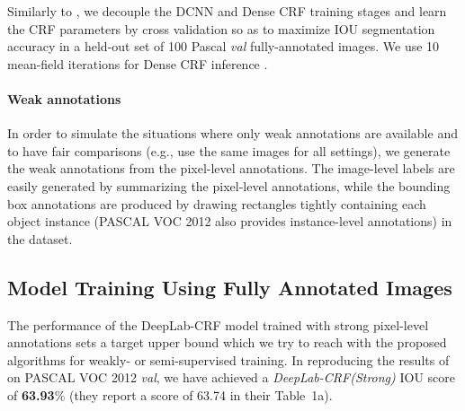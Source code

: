 Similarly to \citet{chen2014semantic}, we decouple the DCNN and Dense
CRF training stages and learn the CRF parameters by cross validation
so as to maximize IOU segmentation accuracy in a held-out set of 100
Pascal \textsl{val} fully-annotated images. We use 10 mean-field
iterations for Dense CRF inference \citep{krahenbuhl2011efficient}.

\paragraph{Weak annotations}

In order to simulate the situations where only weak annotations are
available and to have fair comparisons (e.g., use the same images for
all settings), we generate the weak annotations from the pixel-level
annotations. The image-level labels are easily generated by
summarizing the pixel-level annotations, while the bounding box
annotations are produced by drawing rectangles tightly containing each
object instance (PASCAL VOC 2012 also provides instance-level
annotations) in the dataset.

\subsection{Model Training Using Fully Annotated Images}
\label{sec:test_pixel}

The performance of the DeepLab-CRF model trained with strong
pixel-level annotations sets a target upper bound which we try to
reach with the proposed algorithms for weakly- or semi-supervised
training. In reproducing the results of \citep{chen2014semantic} on
PASCAL VOC 2012 \textsl{val}, we have achieved a
\textsl{DeepLab-CRF(Strong)} IOU score of \textbf{63.93}\% (they
report a score of 63.74 in their Table~1a).


